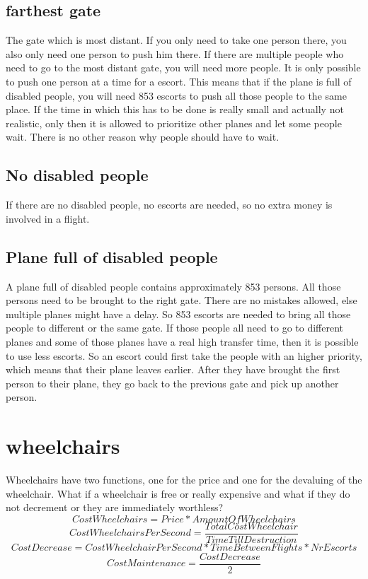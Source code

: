 \documentclass[a4paper, 11pt, notitlepage]{report}
\begin{document}
\subsection{farthest gate}
The gate which is most distant. If you only need to take one person there, you also only need one person to push him there. If there are multiple people who need to go to the most distant gate, you will need more people. It is only possible to push one person at a time for a escort. This means that if the plane is full of disabled people, you will need 853 escorts to push all those people to the same place. If the time in which this has to be done is really small and actually not realistic, only then it is allowed to prioritize other planes and let some people wait. There is no other reason why people should have to wait.
\subsection{No disabled people}
If there are no disabled people, no escorts are needed, so no extra money is involved in a flight.
\subsection{Plane full of disabled people}
A plane full of disabled people contains approximately 853 persons. All those persons need to be brought to the right gate. There are no mistakes allowed, else multiple planes might have a delay. So 853 escorts are needed to bring all those people to different or the same gate. If those people all need to go to different planes and some of those planes have a real high transfer time, then it is possible to use less escorts. So an escort could first take the people with an higher priority, which means that their plane leaves earlier. After they have brought the first person to their plane, they go back to the previous gate and pick up another person.
\section{wheelchairs}
Wheelchairs have two functions, one for the price and one for the devaluing of the wheelchair. What if a wheelchair is free or really expensive and what if they do not decrement or they are immediately worthless?\\
\begin{equation}
CostWheelchairs = Price * AmountOfWheelchairs
\end{equation}
\begin{equation}
CostWheelchairsPerSecond = \frac{TotalCostWheelchair}{TimeTillDestruction}
\end{equation}
\begin{equation}
CostDecrease = CostWheelchairPerSecond * TimeBetweenFlights * NrEscorts
\end{equation}
\begin{equation}
CostMaintenance = \frac{CostDecrease}{2}
\end{equation}
\end{document}
